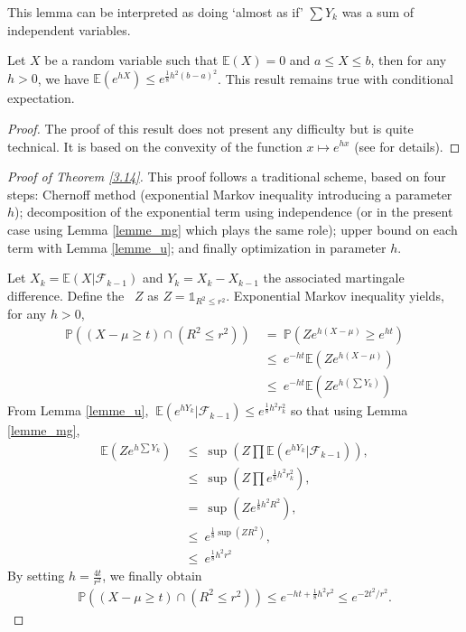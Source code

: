 This lemma can be interpreted as doing `almost as if' $\sum Y_k$ was a sum of independent variables. %

\begin{lemma} 
 \label{lemme_u}
Let $X$ be a random variable such that $\mathbb{E}(X) = 0 $ and $a \leq X \leq b$, then for any $h>0$, we have $\mathbb{E}(e^{hX}) \leq e^{\frac{1}{8}h^2(b-a)^2} $.
This result remains true with conditional expectation.%
\end{lemma}
\begin{proof}
The proof of this result does not present any difficulty but is quite technical. It is based on the convexity of the function
$x \mapsto e^{hx}$ (see \cite{McDiarmid98} for details).
\end{proof}

\begin{proof}[Proof of Theorem \ref{3.14}]
This proof follows a traditional scheme, based on four steps: Chernoff method (exponential Markov inequality introducing a parameter $h$); decomposition of the exponential term using independence (or in the present case using Lemma \ref{lemme_mg} which plays the same role); upper bound on each term with Lemma \ref{lemme_u}; and finally optimization in parameter $h$.

Let $X_k=\mathbb{E}(X|\mathcal{F}_{k-1})$ and $Y_k=X_k-X_{k-1}$ the associated martingale difference.
Define the \rv~$Z$ as $Z=\mathds{1}_{R^2 \leq r^2}$. Exponential Markov inequality yields, for any $h>0$,
\begin{align*}
\mathbb{P}((X-\mu \geq t)\cap(R^2 \leq r^2)) 
 &~=~ \mathbb{P}(Ze^{h(X-\mu)} \geq e^{ht})\\
 &~\leq~ e^{-ht}\mathbb{E}(Ze^{h(X-\mu)})\\
 &~\leq~ e^{-ht}\mathbb{E}(Ze^{h(\sum Y_k)}) 
 \end{align*}
From Lemma \ref{lemme_u}, $~\mathbb{E}(e^{hY_k}|\mathcal{F}_{k-1}) \leq e^{\frac{1}{8}h^2r_k^2}$ so that using Lemma \ref{lemme_mg},
\begin{align*}
 \mathbb{E}(Ze^{h\sum Y_k}) &~\leq~ \sup(Z \prod \mathbb{E}(e^{hY_k}|\mathcal{F}_{k-1})),\\
&~\leq~  \sup(Z \prod e^{\frac{1}{8}h^2 r_k^2}),\\
&~=~ \sup(Z e^{\frac{1}{8}h^2R^2}),\\
&~\leq~ e^{\frac{1}{8}\sup(ZR^2)},\\
&~\leq~ e^{\frac{1}{8}h^2r^2}
\end{align*}
By setting $h=\frac{4t}{r^2}$, we finally obtain
\begin{align*}
\mathbb{P}((X-\mu \geq t)\cap(R^2 \leq r^2)) \leq e^{-ht+\frac{1}{8}h^2r^2} \leq e^{-2t^2/r^2}.
\end{align*} 

\end{proof}


